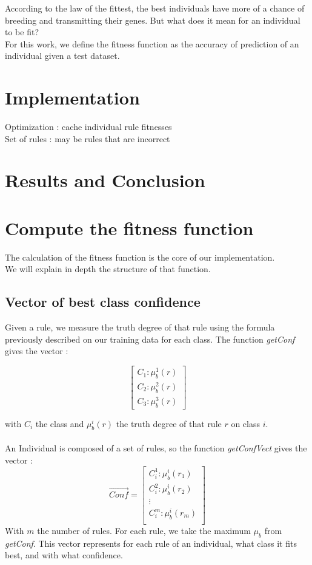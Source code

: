 \documentclass[a4paper,12pt]{article}
\begin{document}
According to the law of the fittest, the best individuals have more of a chance of breeding and transmitting their genes. But what does it mean for an individual to be fit?\\
For this work, we define the fitness function as the accuracy of prediction of an individual given a test dataset.

\section{Implementation}

Optimization : cache individual rule fitnesses\\
Set of rules : may be rules that are incorrect 

\section{Results and Conclusion}




\section{Compute the fitness function}

The calculation of the fitness function is the core of our implementation.\\
We will explain in depth the structure of that function.

\subsection{Vector of best class confidence}

Given a rule, we measure the truth degree of that rule using the formula previously described on our training data for each class.
The function \textit{getConf} gives the vector :

\[
\begin{bmatrix}
C_1:\mu_b^1(r)\\
C_2:\mu_b^2(r)\\
C_3:\mu_b^3(r)
\end{bmatrix} \]

with $C_i$ the class and $\mu_b^i(r)$ the truth degree of that rule $r$ on class $i$.
\\
\\
An Individual is composed of a set of rules, so the function \textit{getConfVect} gives the vector :
\[
\vec{Conf}=
\begin{bmatrix}
C_i^1:\mu_b^i(r_1)\\
C_i^2:\mu_b^i(r_2)\\
\vdots\\
C_i^m:\mu_b^i(r_m)\\
\end{bmatrix} \]
With $m$ the number of rules. For each rule, we take the maximum $\mu_b$ from \textit{getConf}. This vector represents for each rule of an individual, what class it fits best, and with what confidence.
\end{document}
